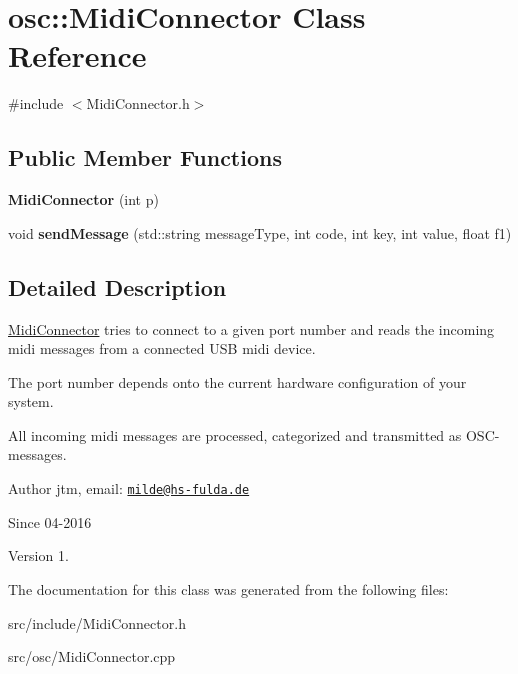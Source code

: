 \hypertarget{classosc_1_1MidiConnector}{\section{osc\-:\-:Midi\-Connector Class Reference}
\label{classosc_1_1MidiConnector}
}


{\ttfamily \#include $<$Midi\-Connector.\-h$>$}

\subsection*{Public Member Functions}
\begin{DoxyCompactItemize}
\item 
\hypertarget{classosc_1_1MidiConnector_a1629e8c842409a21dbc78258794556cc}{{\bfseries Midi\-Connector} (int p)}\label{classosc_1_1MidiConnector_a1629e8c842409a21dbc78258794556cc}

\item 
\hypertarget{classosc_1_1MidiConnector_a700ee4383b29cd2bdc73f7cfc61a360e}{void {\bfseries send\-Message} (std\-::string message\-Type, int code, int key, int value, float f1)}\label{classosc_1_1MidiConnector_a700ee4383b29cd2bdc73f7cfc61a360e}

\end{DoxyCompactItemize}


\subsection{Detailed Description}
\hyperlink{classosc_1_1MidiConnector}{Midi\-Connector} tries to connect to a given port number and reads the incoming midi messages from a connected U\-S\-B midi device.

The port number depends onto the current hardware configuration of your system.

All incoming midi messages are processed, categorized and transmitted as O\-S\-C-\/messages.

\begin{DoxyAuthor}{Author}
jtm, email\-:  \href{mailto:milde@hs-fulda.de}{\tt milde@hs-\/fulda.\-de} 
\end{DoxyAuthor}
\begin{DoxySince}{Since}
04-\/2016 
\end{DoxySince}
\begin{DoxyVersion}{Version}
1. 
\end{DoxyVersion}


The documentation for this class was generated from the following files\-:\begin{DoxyCompactItemize}
\item 
src/include/Midi\-Connector.\-h\item 
src/osc/Midi\-Connector.\-cpp\end{DoxyCompactItemize}
